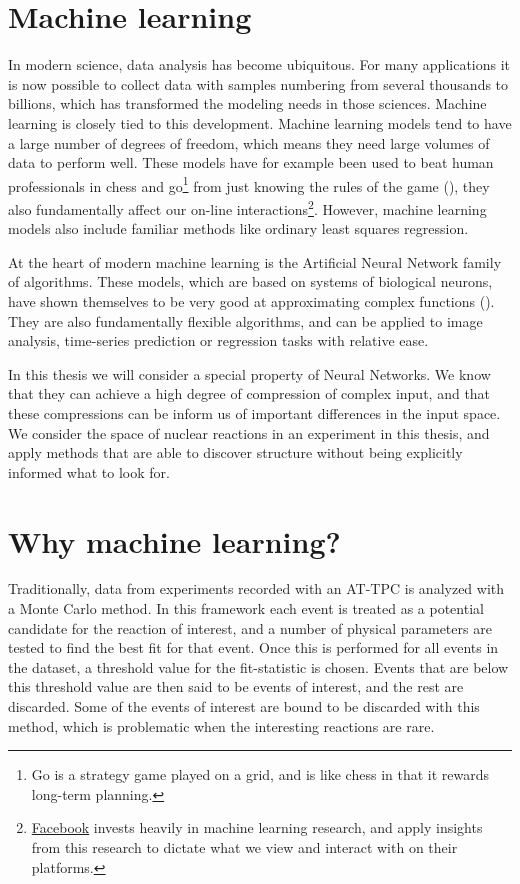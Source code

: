 \section{Machine learning}

In modern science, data analysis has become ubiquitous. For many applications it is now possible to collect data with samples numbering from several thousands to billions, which has transformed the modeling needs in those sciences. Machine learning is closely tied to this development. Machine learning models tend to have a large number of degrees of freedom, which means they need large volumes of data to perform well. These models have for example been used to beat human professionals in chess and go\footnote{Go is a strategy game played on a grid, and is like chess in that it rewards long-term planning.} from just knowing the rules of the game (\cite{Silver2017}), they also fundamentally affect our on-line interactions\footnote{\href{https://research.fb.com/category/machine-learning/}{Facebook} invests heavily in machine learning research, and apply insights from this research to dictate what we view and interact with on their platforms.}. However, machine learning models also include familiar methods like ordinary least squares regression. 

At the heart of modern machine learning is the Artificial Neural Network family of algorithms. These models, which are based on systems of biological neurons, have shown themselves to be very good at approximating complex functions (\cite{Lin2017}). They are also fundamentally flexible algorithms, and can be applied to image analysis, time-series prediction or regression tasks with relative ease.

In this thesis we will consider a special property of Neural Networks. We know that they can achieve a high degree of compression of complex input, and that these compressions can be inform us of important differences in the input space. We consider the space of nuclear reactions in an experiment in this thesis, and apply methods that are able to discover structure without being explicitly informed what to look for.

\section{Why machine learning?}

Traditionally, data from experiments recorded with an AT-TPC is analyzed with a Monte Carlo method. In this framework each event is treated as a potential candidate for the reaction of interest, and a number of physical parameters are tested to find the best fit for that event. Once this is performed for all events in the dataset, a threshold value for the fit-statistic is chosen. Events that are below this threshold value are then said to be events of interest, and the rest are discarded. Some of the events of interest are bound to be discarded with this method, which is problematic when the interesting reactions are rare. 

